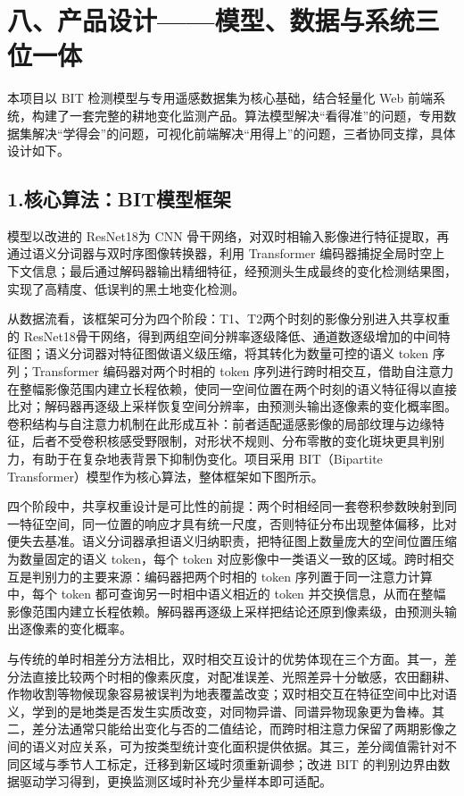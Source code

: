 \documentclass[12pt, a4paper]{ctexart}
\begin{document}
\section{八、产品设计——模型、数据与系统三位一体}

本项目以 BIT 检测模型与专用遥感数据集为核心基础，结合轻量化 Web 前端系统，构建了一套完整的耕地变化监测产品。算法模型解决“看得准”的问题，专用数据集解决“学得会”的问题，可视化前端解决“用得上”的问题，三者协同支撑，具体设计如下。

\subsection{1.核心算法：BIT模型框架}

模型以改进的 ResNet18为 CNN 骨干网络，对双时相输入影像进行特征提取，再通过语义分词器与双时序图像转换器，利用 Transformer 编码器捕捉全局时空上下文信息；最后通过解码器输出精细特征，经预测头生成最终的变化检测结果图，实现了高精度、低误判的黑土地变化检测。

从数据流看，该框架可分为四个阶段：T1、T2两个时刻的影像分别进入共享权重的 ResNet18骨干网络，得到两组空间分辨率逐级降低、通道数逐级增加的中间特征图；语义分词器对特征图做语义级压缩，将其转化为数量可控的语义 token 序列；Transformer 编码器对两个时相的 token 序列进行跨时相交互，借助自注意力在整幅影像范围内建立长程依赖，使同一空间位置在两个时刻的语义特征得以直接比对；解码器再逐级上采样恢复空间分辨率，由预测头输出逐像素的变化概率图。卷积结构与自注意力机制在此形成互补：前者适配遥感影像的局部纹理与边缘特征，后者不受卷积核感受野限制，对形状不规则、分布零散的变化斑块更具判别力，有助于在复杂地表背景下抑制伪变化。项目采用 BIT（Bipartite Transformer）模型\cite{ref1,ref8}作为核心算法，整体框架如下图所示。

四个阶段中，共享权重设计是可比性的前提：两个时相经同一套卷积参数映射到同一特征空间，同一位置的响应才具有统一尺度，否则特征分布出现整体偏移，比对便失去基准。语义分词器承担语义归纳职责，把特征图上数量庞大的空间位置压缩为数量固定的语义 token，每个 token 对应影像中一类语义一致的区域。跨时相交互是判别力的主要来源：编码器把两个时相的 token 序列置于同一注意力计算中，每个 token 都可查询另一时相中语义相近的 token 并交换信息，从而在整幅影像范围内建立长程依赖。解码器再逐级上采样把结论还原到像素级，由预测头输出逐像素的变化概率。

与传统的单时相差分方法相比，双时相交互设计的优势体现在三个方面。其一，差分法直接比较两个时相的像素灰度，对配准误差、光照差异十分敏感，农田翻耕、作物收割等物候现象容易被误判为地表覆盖改变；双时相交互在特征空间中比对语义，学到的是地类是否发生实质改变，对同物异谱、同谱异物现象更为鲁棒。其二，差分法通常只能给出变化与否的二值结论，而跨时相注意力保留了两期影像之间的语义对应关系，可为按类型统计变化面积提供依据。其三，差分阈值需针对不同区域与季节人工标定，迁移到新区域时须重新调参；改进 BIT 的判别边界由数据驱动学习得到，更换监测区域时补充少量样本即可适配。
\end{document}
